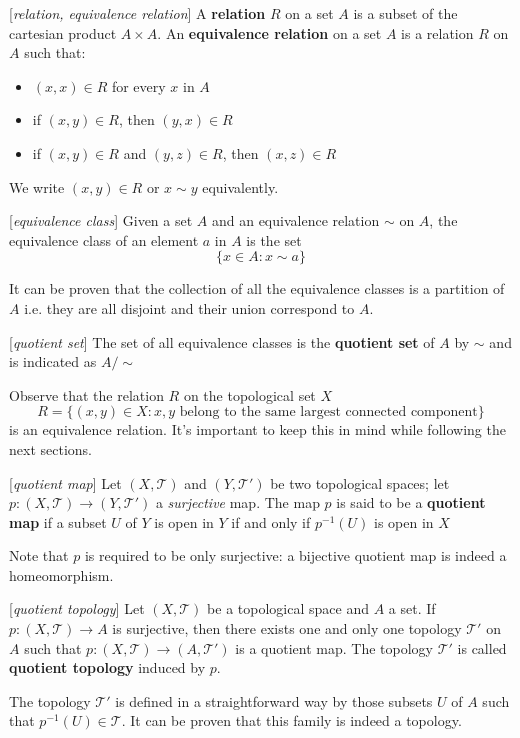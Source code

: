 \begin{definition}{[\textit{relation, equivalence relation}]}
	A \textbf{relation} $R$ on a set $A$ is a subset of the cartesian product $A\times A$. An \textbf{equivalence relation} on a set $A$ is a relation $R$ on $A$ such that:
	\begin{itemize}
		\item $(x,x)\in R$ for every $x$ in $A$
		\item if $(x,y)\in R$, then $(y,x)\in R$
		\item if $(x,y)\in R$ and $(y,z)\in R$, then $(x,z)\in R$
	\end{itemize}
	We write $(x,y)\in R$ or $x\sim y$ equivalently.
\end{definition}
\begin{definition}{[\textit{equivalence class}]}
	Given a set $A$ and an equivalence relation $\sim$ on $A$, the equivalence class of an element $a$ in $A$ is the set $$\{x \in A : x \sim a\}$$
\end{definition}
It can be proven that the collection of all the equivalence classes is a partition of $A$ i.e. they are all disjoint and their union correspond to $A$.
\begin{definition}{[\textit{quotient set}]}
	The set of all equivalence classes is the \textbf{quotient set} of $A$ by $\sim$ and is indicated as $A / \sim$
\end{definition}
Observe that the relation $R$ on the topological set $X$ $$R=\{(x,y) \in X : x,y \text{ belong to the same largest connected component} \}$$ is an equivalence relation. It's important to keep this in mind while following  the next sections.
\begin{definition}{[\textit{quotient map}]}
	Let $(X,\mathcal{T})$ and $(Y,\mathcal{T}')$ be two topological spaces; let $p : (X,\mathcal{T})\rightarrow (Y,\mathcal{T}')$ a \textit{surjective} map. The map $p$ is said to be a \textbf{quotient map} if a subset $U$ of $Y$ is open in $Y$ if and only if $p^{-1}(U)$ is open in $X$
\end{definition}
Note that $p$ is required to be only surjective: a bijective quotient map is indeed a homeomorphism.
\begin{definition}{[\textit{quotient topology}]}
	Let $(X,\mathcal{T})$ be a topological space and $A$ a set. If $p : (X,\mathcal{T})\rightarrow A$ is surjective, then there exists one and only one topology $\mathcal{T}'$ on $A$ such that $p : (X,\mathcal{T})\rightarrow (A,\mathcal{T}')$ is a quotient map. The topology $\mathcal{T}'$ is called \textbf{quotient topology} induced by $p$.
\end{definition}
The topology $\mathcal{T}'$ is defined in a straightforward way by those subsets $U$ of $A$ such that $p^{-1}(U)\in\mathcal{T}$. It can be proven that this family is indeed a topology.

